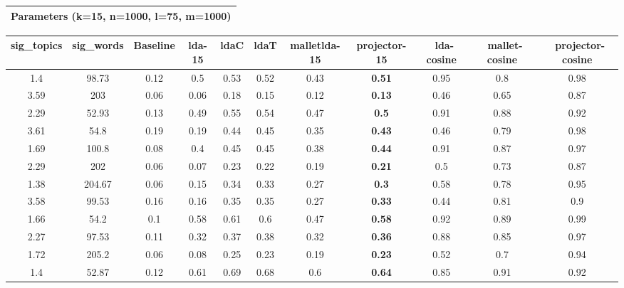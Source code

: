 \documentclass[10pt]{article}
\begin{document}
\begin{tabular}{|c|}
\hline 
 Parameters (k=15, n=1000, l=75, m=1000) \\
 \hline 

\end{tabular}



\begin{tabular}{|c|c|c|c|c|c|c|c|c|c|c|}
\hline 
sig\_topics &sig\_words &Baseline &lda-15 &ldaC &ldaT &malletlda-15 &projector-15 &~lda-cosine &~mallet-cosine &~projector-cosine \\
 \hline 
1.4  &98.73  &{0.12}
  &{0.5}
  &{0.53}
  &{0.52}
  &{0.43}
  &\textbf{0.51}
  &0.95  &0.8  &0.98  \\
 \hline 
3.59  &203  &{0.06}
  &{0.06}
  &{0.18}
  &{0.15}
  &{0.12}
  &\textbf{0.13}
  &0.46  &0.65  &0.87  \\
 \hline 
2.29  &52.93  &{0.13}
  &{0.49}
  &{0.55}
  &{0.54}
  &{0.47}
  &\textbf{0.5}
  &0.91  &0.88  &0.92  \\
 \hline 
3.61  &54.8  &{0.19}
  &{0.19}
  &{0.44}
  &{0.45}
  &{0.35}
  &\textbf{0.43}
  &0.46  &0.79  &0.98  \\
 \hline 
1.69  &100.8  &{0.08}
  &{0.4}
  &{0.45}
  &{0.45}
  &{0.38}
  &\textbf{0.44}
  &0.91  &0.87  &0.97  \\
 \hline 
2.29  &202  &{0.06}
  &{0.07}
  &{0.23}
  &{0.22}
  &{0.19}
  &\textbf{0.21}
  &0.5  &0.73  &0.87  \\
 \hline 
1.38  &204.67  &{0.06}
  &{0.15}
  &{0.34}
  &{0.33}
  &{0.27}
  &\textbf{0.3}
  &0.58  &0.78  &0.95  \\
 \hline 
3.58  &99.53  &{0.16}
  &{0.16}
  &{0.35}
  &{0.35}
  &{0.27}
  &\textbf{0.33}
  &0.44  &0.81  &0.9  \\
 \hline 
1.66  &54.2  &{0.1}
  &{0.58}
  &{0.61}
  &{0.6}
  &{0.47}
  &\textbf{0.58}
  &0.92  &0.89  &0.99  \\
 \hline 
2.27  &97.53  &{0.11}
  &{0.32}
  &{0.37}
  &{0.38}
  &{0.32}
  &\textbf{0.36}
  &0.88  &0.85  &0.97  \\
 \hline 
1.72  &205.2  &{0.06}
  &{0.08}
  &{0.25}
  &{0.23}
  &{0.19}
  &\textbf{0.23}
  &0.52  &0.7  &0.94  \\
 \hline 
1.4  &52.87  &{0.12}
  &{0.61}
  &{0.69}
  &{0.68}
  &{0.6}
  &\textbf{0.64}
  &0.85  &0.91  &0.92  \\
 \hline 

\end{tabular}
\end{document}

